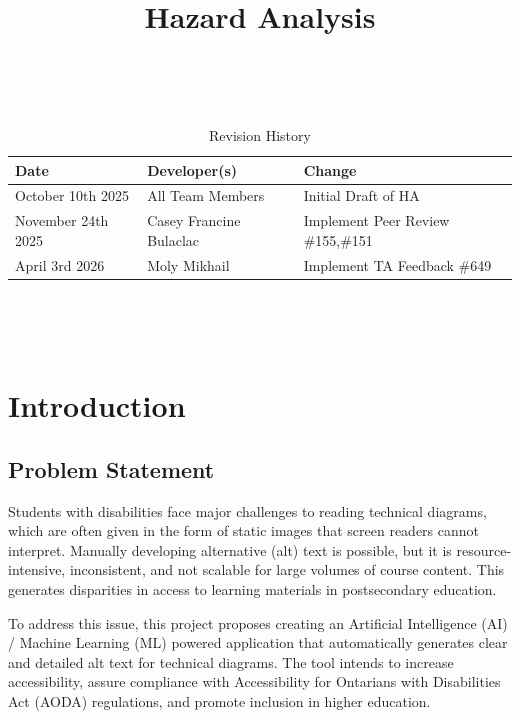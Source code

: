 \documentclass{article}
\title{Hazard Analysis\\\progname}
\author{\authname}
\date{}
\begin{document}
\maketitle
\thispagestyle{empty}

~\newpage


\begin{table}[hp]
  \caption{Revision History} \label{TblRevisionHistory}
  \begin{tabularx}{\textwidth}{llX}
    \toprule
    \textbf{Date} & \textbf{Developer(s)} & \textbf{Change}\\
    \midrule
    October 10th 2025 & All Team Members & Initial Draft of HA \\
    November 24th 2025 & Casey Francine Bulaclac & Implement Peer Review \#155,\#151 \\
    April 3rd 2026 & Moly Mikhail & Implement TA Feedback \#649\\
    \bottomrule
  \end{tabularx}
\end{table}

~\newpage

\tableofcontents

~\newpage



\section{Introduction}

\subsection{Problem Statement}
Students with disabilities face major challenges to reading technical diagrams, which are often given in the form of static images that screen readers cannot interpret. Manually developing alternative (alt) text is possible, but it is resource-intensive, inconsistent, and not scalable for large volumes of course content. This generates disparities in access to learning materials in postsecondary education.

To address this issue, this project proposes creating an Artificial Intelligence (AI) / Machine Learning (ML) powered application that automatically generates clear and detailed alt text for technical diagrams. The tool intends to increase accessibility, assure compliance with Accessibility for Ontarians with Disabilities Act (AODA) regulations, and promote inclusion in higher education.
\end{document}
